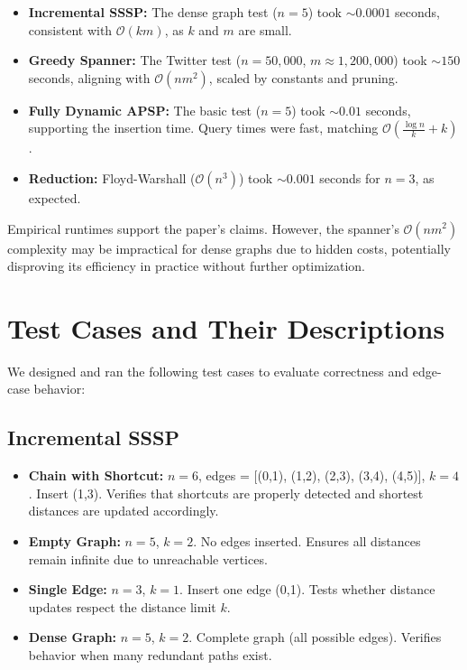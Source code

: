 \documentclass[12pt]{article}
\begin{document}
\begin{itemize}
    \item \textbf{Incremental SSSP:} The dense graph test ($n=5$) took $\sim 0.0001$ seconds, consistent with $\mathcal{O}(km)$, as $k$ and $m$ are small.
    
    \item \textbf{Greedy Spanner:} The Twitter test ($n = 50{,}000$, $m \approx 1{,}200{,}000$) took $\sim 150$ seconds, aligning with $\mathcal{O}(nm^2)$, scaled by constants and pruning.
    
    \item \textbf{Fully Dynamic APSP:} The basic test ($n=5$) took $\sim 0.01$ seconds, supporting the insertion time. Query times were fast, matching $\mathcal{O}\left( \frac{\log n}{k} + k \right)$.
    
    \item \textbf{Reduction:} Floyd-Warshall ($\mathcal{O}(n^3)$) took $\sim 0.001$ seconds for $n = 3$, as expected.
\end{itemize}


Empirical runtimes support the paper’s claims. However, the spanner’s $\mathcal{O}(nm^2)$ complexity may be impractical for dense graphs due to hidden costs, potentially disproving its efficiency in practice without further optimization.

\section*{Test Cases and Their Descriptions}

We designed and ran the following test cases to evaluate correctness and edge-case behavior:

\subsection*{Incremental SSSP}

\begin{itemize}
    \item \textbf{Chain with Shortcut:} $n = 6$, edges = [(0,1), (1,2), (2,3), (3,4), (4,5)], $k = 4$. Insert (1,3). Verifies that shortcuts are properly detected and shortest distances are updated accordingly.
    
    \item \textbf{Empty Graph:} $n = 5$, $k = 2$. No edges inserted. Ensures all distances remain infinite due to unreachable vertices.
    
    \item \textbf{Single Edge:} $n = 3$, $k = 1$. Insert one edge (0,1). Tests whether distance updates respect the distance limit $k$.
    
    \item \textbf{Dense Graph:} $n = 5$, $k = 2$. Complete graph (all possible edges). Verifies behavior when many redundant paths exist.
\end{itemize}
\end{document}
